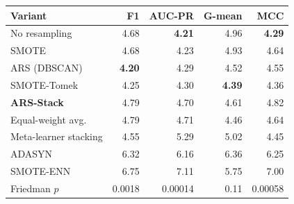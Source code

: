 \begin{tabular}{lrrrr}
\toprule
Variant & F1 & AUC-PR & G-mean & MCC \\
\midrule
No resampling & 4.68 & \textbf{4.21} & 4.96 & \textbf{4.29} \\
SMOTE & 4.68 & 4.23 & 4.93 & 4.64 \\
ARS (DBSCAN) & \textbf{4.20} & 4.29 & 4.52 & 4.55 \\
SMOTE-Tomek & 4.25 & 4.30 & \textbf{4.39} & 4.36 \\
\textbf{ARS-Stack} & 4.79 & 4.70 & 4.61 & 4.82 \\
Equal-weight avg. & 4.79 & 4.71 & 4.46 & 4.64 \\
Meta-learner stacking & 4.55 & 5.29 & 5.02 & 4.45 \\
ADASYN & 6.32 & 6.16 & 6.36 & 6.25 \\
SMOTE-ENN & 6.75 & 7.11 & 5.75 & 7.00 \\
\midrule
Friedman $p$ & 0.0018 & 0.00014 & 0.11 & 0.00058 \\
\bottomrule
\end{tabular}
